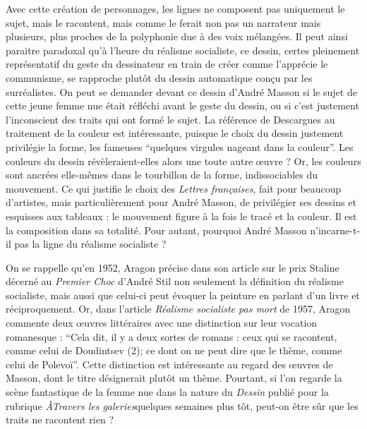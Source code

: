 	Avec cette création de personnages, les lignes ne composent pas uniquement le sujet, mais le racontent, mais comme le ferait non pas un narrateur mais plusieurs, plus proches de la polyphonie due à des voix mélangées. Il peut ainsi paraitre paradoxal qu’à l’heure du réalisme socialiste, ce dessin, certes pleinement représentatif du geste du dessinateur en train de créer comme l’apprécie le communisme, se rapproche plutôt du dessin automatique conçu par les surréalistes. On peut se demander devant ce dessin d’André Masson si le sujet de cette jeune femme nue était réfléchi avant le geste du dessin, ou si c’est justement l’inconscient des traits qui ont formé le sujet. La référence de Descargues au traitement de la couleur est intéressante, puisque le choix du dessin justement privilégie la forme, les fameuses \enquote{quelques virgules nageant dans la couleur}. Les couleurs du dessin révèleraient-elles alors une toute autre \oe{}uvre ? Or, les couleurs sont ancrées elle-mêmes dans le tourbillon de la forme, indissociables du mouvement. Ce qui justifie le choix des \emph{Lettres françaises}, fait pour beaucoup d’artistes, mais particulièrement pour André Masson, de privilégier ses dessins et esquisses aux tableaux : le mouvement figure à la fois le tracé et la couleur. Il est la composition dans sa totalité. Pour autant, pourquoi André Masson n’incarne-t-il pas  la ligne du réalisme socialiste ? 


On se rappelle qu’en 1952, Aragon précise dans son article sur le prix Staline décerné au \emph{Premier Choc} d’André Stil non seulement la définition du réalisme socialiste, mais aussi que celui-ci peut évoquer la peinture en parlant d’un livre et réciproquement. Or, dans l’article \emph{Réalisme socialiste pas mort} de 1957, Aragon commente deux \oe{}uvres littéraires avec une distinction sur leur vocation romanesque : \enquote{Cela dit, il y a deux sortes de romans : ceux qui se racontent, comme celui de Doudintsev (2); ce dont on ne peut dire que le thème, comme celui de Polevoï}. Cette distinction est intéressante au regard des \oe{}uvres de Masson, dont le titre désignerait plutôt un thème. Pourtant, si l'on regarde la scène fantastique de la femme nue dans la nature du \emph{Dessin }publié pour la rubrique \emph{ÀTravers les galeries}quelques semaines plus tôt, peut-on être sûr que les traits ne racontent rien ? 

